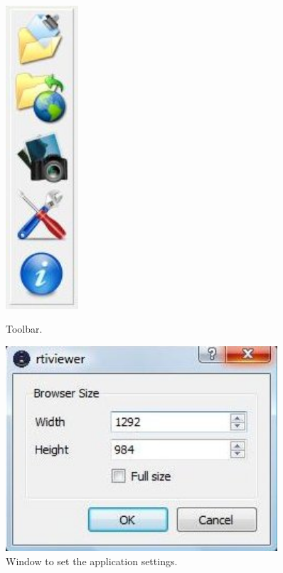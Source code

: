 \documentclass[oneside, 11pt]{book}
\begin{document}
\begin{figure}

\begin{minipage}{0.5\textwidth}
\centering
\includegraphics[width=0.24\textwidth]{toolbar}
\caption{Toolbar.}
\label{fig:toolbar}
\end{minipage}
\hfill
\begin{minipage}{0.5\textwidth}
\centering
\includegraphics[width=0.90\textwidth]{app_settings}
\caption{Window to set the application settings.}
\label{fig:appSettings}
\end{minipage}

\end{figure}
\end{document}

